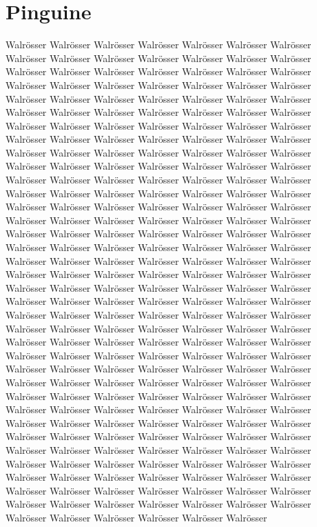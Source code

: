 \documentclass[a4paper, twoside, 12pt]{report}
\begin{document}
    \section{Pinguine}

    Walr\"osser Walr\"osser Walr\"osser Walr\"osser Walr\"osser Walr\"osser Walr\"osser Walr\"osser Walr\"osser Walr\"osser Walr\"osser Walr\"osser Walr\"osser Walr\"osser Walr\"osser Walr\"osser Walr\"osser Walr\"osser Walr\"osser Walr\"osser Walr\"osser Walr\"osser Walr\"osser Walr\"osser Walr\"osser Walr\"osser Walr\"osser Walr\"osser Walr\"osser Walr\"osser Walr\"osser Walr\"osser Walr\"osser Walr\"osser Walr\"osser Walr\"osser Walr\"osser Walr\"osser Walr\"osser Walr\"osser Walr\"osser Walr\"osser Walr\"osser Walr\"osser Walr\"osser Walr\"osser Walr\"osser Walr\"osser Walr\"osser Walr\"osser Walr\"osser Walr\"osser Walr\"osser Walr\"osser Walr\"osser Walr\"osser Walr\"osser Walr\"osser Walr\"osser Walr\"osser Walr\"osser Walr\"osser Walr\"osser Walr\"osser Walr\"osser Walr\"osser Walr\"osser Walr\"osser Walr\"osser Walr\"osser Walr\"osser Walr\"osser Walr\"osser Walr\"osser Walr\"osser Walr\"osser Walr\"osser Walr\"osser Walr\"osser Walr\"osser Walr\"osser Walr\"osser Walr\"osser Walr\"osser Walr\"osser Walr\"osser Walr\"osser Walr\"osser Walr\"osser Walr\"osser Walr\"osser Walr\"osser Walr\"osser Walr\"osser Walr\"osser Walr\"osser Walr\"osser Walr\"osser Walr\"osser Walr\"osser  Walr\"osser Walr\"osser Walr\"osser Walr\"osser Walr\"osser Walr\"osser Walr\"osser Walr\"osser Walr\"osser Walr\"osser Walr\"osser Walr\"osser Walr\"osser Walr\"osser Walr\"osser Walr\"osser Walr\"osser Walr\"osser Walr\"osser Walr\"osser Walr\"osser Walr\"osser Walr\"osser Walr\"osser Walr\"osser Walr\"osser Walr\"osser Walr\"osser Walr\"osser Walr\"osser Walr\"osser Walr\"osser Walr\"osser Walr\"osser Walr\"osser Walr\"osser Walr\"osser Walr\"osser Walr\"osser Walr\"osser Walr\"osser Walr\"osser Walr\"osser Walr\"osser Walr\"osser Walr\"osser Walr\"osser Walr\"osser Walr\"osser Walr\"osser Walr\"osser Walr\"osser Walr\"osser Walr\"osser Walr\"osser Walr\"osser Walr\"osser Walr\"osser Walr\"osser Walr\"osser Walr\"osser Walr\"osser Walr\"osser Walr\"osser Walr\"osser Walr\"osser Walr\"osser Walr\"osser Walr\"osser Walr\"osser Walr\"osser Walr\"osser Walr\"osser Walr\"osser Walr\"osser Walr\"osser Walr\"osser Walr\"osser Walr\"osser Walr\"osser Walr\"osser Walr\"osser Walr\"osser Walr\"osser Walr\"osser Walr\"osser Walr\"osser Walr\"osser Walr\"osser Walr\"osser Walr\"osser Walr\"osser Walr\"osser Walr\"osser Walr\"osser Walr\"osser Walr\"osser Walr\"osser Walr\"osser Walr\"osser  Walr\"osser Walr\"osser Walr\"osser Walr\"osser Walr\"osser Walr\"osser Walr\"osser Walr\"osser Walr\"osser Walr\"osser Walr\"osser Walr\"osser Walr\"osser Walr\"osser Walr\"osser Walr\"osser Walr\"osser Walr\"osser Walr\"osser Walr\"osser Walr\"osser Walr\"osser Walr\"osser Walr\"osser Walr\"osser Walr\"osser Walr\"osser Walr\"osser Walr\"osser Walr\"osser Walr\"osser Walr\"osser Walr\"osser Walr\"osser Walr\"osser Walr\"osser Walr\"osser Walr\"osser Walr\"osser Walr\"osser Walr\"osser Walr\"osser Walr\"osser Walr\"osser Walr\"osser Walr\"osser Walr\"osser Walr\"osser Walr\"osser Walr\"osser Walr\"osser 
\end{document}
